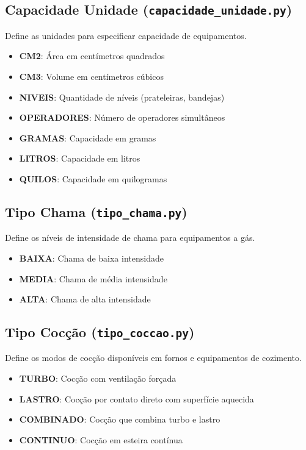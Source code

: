 \documentclass[11pt,a4paper]{article}
\begin{document}
\subsection{Capacidade Unidade (\texttt{capacidade\_unidade.py})}

Define as unidades para especificar capacidade de equipamentos.

\begin{itemize}[leftmargin=2cm]
    \item \textbf{CM2}: Área em centímetros quadrados
    \item \textbf{CM3}: Volume em centímetros cúbicos
    \item \textbf{NIVEIS}: Quantidade de níveis (prateleiras, bandejas)
    \item \textbf{OPERADORES}: Número de operadores simultâneos
    \item \textbf{GRAMAS}: Capacidade em gramas
    \item \textbf{LITROS}: Capacidade em litros
    \item \textbf{QUILOS}: Capacidade em quilogramas
\end{itemize}

\subsection{Tipo Chama (\texttt{tipo\_chama.py})}

Define os níveis de intensidade de chama para equipamentos a gás.

\begin{itemize}[leftmargin=2cm]
    \item \textbf{BAIXA}: Chama de baixa intensidade
    \item \textbf{MEDIA}: Chama de média intensidade
    \item \textbf{ALTA}: Chama de alta intensidade
\end{itemize}

\subsection{Tipo Cocção (\texttt{tipo\_coccao.py})}

Define os modos de cocção disponíveis em fornos e equipamentos de cozimento.

\begin{itemize}[leftmargin=2cm]
    \item \textbf{TURBO}: Cocção com ventilação forçada
    \item \textbf{LASTRO}: Cocção por contato direto com superfície aquecida
    \item \textbf{COMBINADO}: Cocção que combina turbo e lastro
    \item \textbf{CONTINUO}: Cocção em esteira contínua
\end{itemize}
\end{document}
